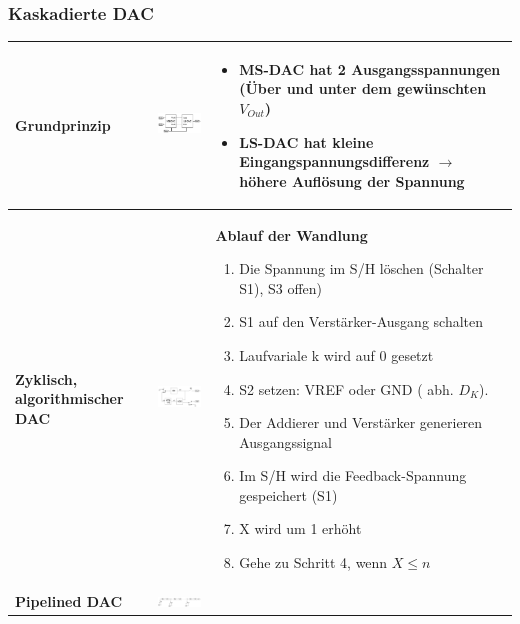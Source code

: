 \subsubsection{Kaskadierte DAC}
\begin{longtable}{|>{\bfseries}p{4cm}|c|p{8cm}|}
	\hline
	Grundprinzip
	& \includegraphics[width=6cm, valign=t]{./pictures/kaskadiertDAC.png}
	& \begin{itemize}
  		\item MS-DAC hat 2 Ausgangsspannungen (Über und unter dem gewünschten
  			$V_{Out}$)
  		\item LS-DAC hat kleine Eingangspannungsdifferenz $\to$ höhere Auflösung der
  			Spannung
	  \end{itemize}
	\\ \hline
	Zyklisch, algorithmischer DAC \hartl{466}
	& \includegraphics[width=6cm, valign=t]{./pictures/zyklischDAC.png}
	& \textbf{Ablauf der Wandlung}
	  \begin{enumerate}
  		\item Die Spannung im S/H löschen (Schalter S1), S3 offen)
  		\item S1 auf den Verstärker-Ausgang schalten
  		\item Laufvariale k wird auf 0 gesetzt
  		\item S2 setzen: VREF oder GND ( abh. $D_{K}$).
  		\item Der Addierer und Verstärker generieren Ausgangssignal
  		\item Im S/H wird die Feedback-Spannung gespeichert (S1)
  		\item X wird um 1 erhöht
  		\item Gehe zu Schritt 4, wenn $X\leq n$
	  \end{enumerate}
	\\ \hline
	Pipelined DAC 
	& \includegraphics[width=6cm, valign=t]{pictures/piplinedDAC}

\end{longtable}
